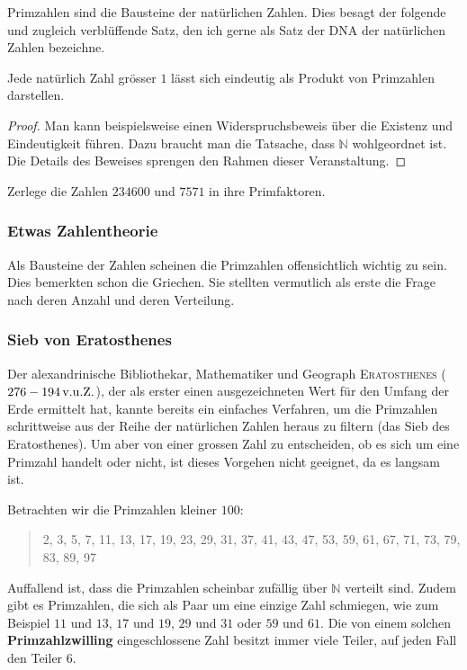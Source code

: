 \documentclass[%
11pt,%
twoside,%
titlepage,%
german,%
headsepline%
]{scrartcl}
\begin{document}
Primzahlen sind die Bausteine der natürlichen Zahlen. Dies besagt der folgende und zugleich verblüffende Satz, den ich gerne als Satz der DNA der natürlichen Zahlen bezeichne.
\begin{csatz}{}
Jede natürlich Zahl grösser $1$ lässt sich eindeutig als Produkt von Primzahlen darstellen.
\end{csatz}
\begin{proof}
Man kann beispielsweise einen Widerspruchsbeweis über die Existenz und Eindeutigkeit führen. Dazu braucht man die Tatsache, dass $\mathbb{N}$ wohlgeordnet ist. Die Details des Beweises sprengen den Rahmen dieser Veranstaltung.
\end{proof}
\begin{ueb}[Primfaktorzerlegung]
Zerlege die Zahlen $234600$ und $7571$ in ihre Primfaktoren.
\end{ueb}

\subsubsection{Etwas Zahlentheorie}

Als Bausteine der Zahlen scheinen die Primzahlen offensichtlich wichtig zu sein. Dies bemerkten schon die Griechen. Sie stellten vermutlich als erste die Frage nach deren Anzahl und deren Verteilung.

\subsubsection{Sieb von Eratosthenes}

Der alexandrinische Bibliothekar, Mathematiker und Geograph  \textsc{Eratosthenes} ($\unit[276-194]{v.u.Z.}$), der als erster einen ausgezeichneten Wert für den Umfang der Erde ermittelt hat, kannte bereits ein einfaches Verfahren, um die Primzahlen schrittweise aus der Reihe der natürlichen Zahlen heraus zu filtern (das Sieb des Eratosthenes). Um aber von einer grossen Zahl zu entscheiden, ob es sich um eine Primzahl handelt oder nicht, ist dieses Vorgehen nicht geeignet, da es langsam ist.

Betrachten wir die Primzahlen kleiner $100$:

\begin{quote}
2, 3, 5, 7, 11, 13, 17, 19, 23, 29, 31, 37, 41, 43, 47, 53, 59, 61, 67, 71, 73, 79, 83, 89, 97
\end{quote}

Auffallend ist, dass die Primzahlen scheinbar zufällig über $\mathbb{N}$ verteilt sind. Zudem gibt es Primzahlen, die sich als Paar um eine einzige Zahl schmiegen, wie zum Beispiel $11$ und $13$, $17$ und $19$, $29$ und $31$ oder $59$ und $61$. Die von einem solchen \textbf{Primzahlzwilling} eingeschlossene Zahl besitzt immer viele Teiler, auf jeden Fall den Teiler $6$.
\end{document}
